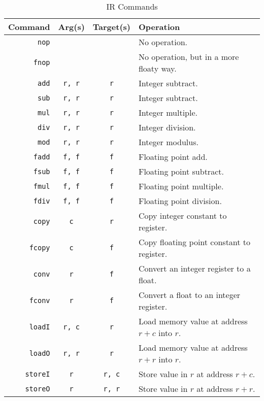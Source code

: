 \documentclass[10pt, onecolumn]{extarticle}
\begin{document}
\begin{longtable}{| r | c | c | l |}
  \caption{IR Commands}
  \label{cmdlist}
  \endfirsthead
  \caption{IR Commands}
  \endhead
  \hline
  Command & Arg(s) & Target(s) & Operation\\\hline
  \texttt{nop} & & & No operation.\\\hline
  \texttt{fnop} & & & No operation, but in a more floaty way.\\\hline\hline

  \texttt{add} & \texttt{r, r} & \texttt{r} & Integer subtract.\\\hline
  \texttt{sub} & \texttt{r, r} & \texttt{r} & Integer subtract.\\\hline
  \texttt{mul} & \texttt{r, r} & \texttt{r} & Integer multiple.\\\hline
  \texttt{div} & \texttt{r, r} & \texttt{r} & Integer division.\\\hline
  \texttt{mod} & \texttt{r, r} & \texttt{r} & Integer modulus.\\\hline\hline

  \texttt{fadd} & \texttt{f, f} & \texttt{f} & Floating point add.\\\hline
  \texttt{fsub} & \texttt{f, f} & \texttt{f} & Floating point subtract.\\\hline
  \texttt{fmul} & \texttt{f, f} & \texttt{f} & Floating point multiple.\\\hline
  \texttt{fdiv} & \texttt{f, f} & \texttt{f} & Floating point division.\\\hline\hline

  \texttt{copy} & \texttt{c} & \texttt{r} & Copy integer constant to register.\\\hline
  \texttt{fcopy} & \texttt{c} & \texttt{f} & Copy floating point constant to register.\\\hline
  \texttt{conv} & \texttt{r} & \texttt{f} & Convert an integer register to a float.\\\hline
  \texttt{fconv} & \texttt{r} & \texttt{f} & Convert a float to an integer register.\\\hline
  \texttt{loadI} & \texttt{r, c} & \texttt{r} & Load memory value at address $r + c$ into $r$.\\\hline
  \texttt{loadO} & \texttt{r, r} & \texttt{r} & Load memory value at address $r + r$ into $r$.\\\hline
  \texttt{storeI} & \texttt{r} & \texttt{r, c} & Store value in $r$ at address $r + c$.\\\hline
  \texttt{storeO} & \texttt{r} & \texttt{r, r} & Store value in $r$ at address $r + r$.\\\hline\hline


\end{longtable}
\end{document}
